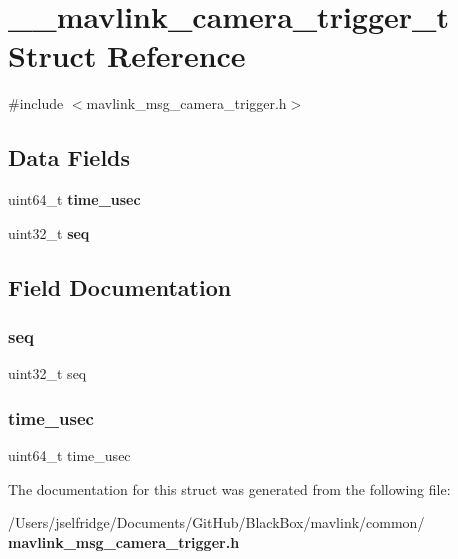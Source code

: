 \section{\+\_\+\+\_\+mavlink\+\_\+camera\+\_\+trigger\+\_\+t Struct Reference}
\label{struct____mavlink__camera__trigger__t}


{\ttfamily \#include $<$mavlink\+\_\+msg\+\_\+camera\+\_\+trigger.\+h$>$}

\subsection*{Data Fields}
\begin{DoxyCompactItemize}
\item 
uint64\+\_\+t \textbf{ time\+\_\+usec}
\item 
uint32\+\_\+t \textbf{ seq}
\end{DoxyCompactItemize}


\subsection{Field Documentation}
\mbox{\label{struct____mavlink__camera__trigger__t_aaf1b939170b82732448a965a5b33ad4e}} 
\subsubsection{seq}
{\footnotesize\ttfamily uint32\+\_\+t seq}

\mbox{\label{struct____mavlink__camera__trigger__t_a2db60704c293664dcb6159b55c98c2f2}} 
\subsubsection{time\+\_\+usec}
{\footnotesize\ttfamily uint64\+\_\+t time\+\_\+usec}



The documentation for this struct was generated from the following file\+:\begin{DoxyCompactItemize}
\item 
/\+Users/jselfridge/\+Documents/\+Git\+Hub/\+Black\+Box/mavlink/common/\textbf{ mavlink\+\_\+msg\+\_\+camera\+\_\+trigger.\+h}\end{DoxyCompactItemize}
